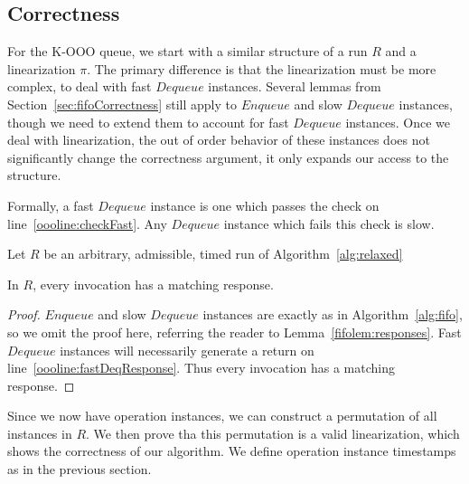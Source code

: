 \documentclass[a4paper,anonymous,USenglish]{lipics-v2021}
\theoremstyle{definition}
\begin{document}
\subsection{Correctness}
For the K-OOO queue, we start with a similar structure of a run $R$ and a linearization $\pi$. The primary difference is that the linearization must be more complex, to deal with fast $Dequeue$ instances.  Several lemmas from Section~\ref{sec:fifoCorrectness} still apply to $Enqueue$ and slow $Dequeue$ instances, though we need to extend them to account for fast $Dequeue$ instances.  Once we deal with linearization, the out of order behavior of these instances does not significantly change the correctness argument, it only expands our access to the structure.

Formally, a fast $Dequeue$ instance is one which passes the check on line~\ref{oooline:checkFast}.  Any $Dequeue$ instance which fails this check is slow.

Let $R$ be an arbitrary, admissible, timed run of Algorithm~\ref{alg:relaxed}

\begin{lemma}
 In $R$, every invocation has a matching response.
\end{lemma}

\begin{proof}
  $Enqueue$ and slow $Dequeue$ instances are exactly as in Algorithm~\ref{alg:fifo}, so we omit the proof here, referring the reader to Lemma~\ref{fifolem:responses}.  Fast $Dequeue$ instances will necessarily generate a return on line~\ref{oooline:fastDeqResponse}.  Thus every invocation has a matching response.
\end{proof}

Since we now have operation instances, we can construct a permutation of all instances in $R$.  We then prove tha this permutation is a valid linearization, which shows the correctness of our algorithm.  We define operation instance timestamps as in the previous section.
\end{document}
